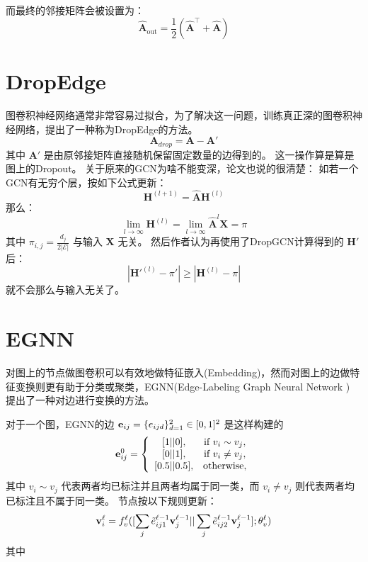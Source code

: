 \documentclass[color=gray,base=hide,cn]{elegantbook}
\begin{document}
而最终的邻接矩阵会被设置为：
\begin{equation}
\mathbf{\hat{A}}_\text{out} = \frac{1}{2} \left(\mathbf{\hat{A}}^\top + \mathbf{\hat{A}} \right)
\end{equation}

\section{DropEdge}
图卷积神经网络通常非常容易过拟合，为了解决这一问题，训练真正深的图卷积神经网络，\cite{Rong2019TheTD}提出了一种称为DropEdge的方法。
\begin{equation}
\mathbf{A}_{drop} = \mathbf{A}-\mathbf{A}'
\end{equation}
其中 $\mathbf{A}'$ 是由原邻接矩阵直接随机保留固定数量的边得到的。
这一操作算是算是图上的Dropout。
关于原来的GCN为啥不能变深，论文也说的很清楚：
如若一个GCN有无穷个层，按如下公式更新：
\begin{equation}
\mathbf{H}^{(l+1)} = \hat{\mathbf{A}}\mathbf{H}^{(l)}
\end{equation}
那么：
\begin{equation}
\lim_{l \rightarrow \infty} \mathbf{H}^{(l)} = \lim_{l \rightarrow \infty} \hat{\mathbf{A}}^l\mathbf{X}=\pi
\end{equation}
其中 $\pi_{i,j}=\frac{d_j}{2|\mathcal{E}|}$ 与输入 $\mathbf{X}$ 无关。
然后作者认为再使用了DropGCN计算得到的 $\mathbf{H}'$ 后：
\begin{equation}
 |\mathbf{H}'^{(l)} - \pi'| \ge |\mathbf{H}^{(l)} - \pi|
\end{equation}
就不会那么与输入无关了。

\section{EGNN}
对图上的节点做图卷积可以有效地做特征嵌入(Embedding)，然而对图上的边做特征变换则更有助于分类或聚类，EGNN(Edge-Labeling Graph Neural Network \cite{kim2019edgelabeling}) 提出了一种对边进行变换的方法。

对于一个图，EGNN的边 ${\bf e}_{ij} = \{e_{ijd}\}_{d=1}^{2} \in [0, 1]^2$ 是这样构建的
\begin{equation}
{\bf e}_{ij}^0 = \left\{\begin{array}{cc} {[1||0]},& \mbox{if} ~ v_i \sim v_j, \\ {[0||1]},&  \mbox{if} ~ v_i \neq v_j, \\ {[0.5||0.5]},& \mbox{otherwise}, \end{array} \right.
\end{equation}
其中 $v_i \sim v_j$ 代表两者均已标注并且两者均属于同一类，而 $v_i \neq v_j$ 则代表两者均已标注且不属于同一类。
节点按以下规则更新：
\begin{equation}
{\bf v}_{i}^{\ell} = f_v^{\ell}([\sum_{j} {\tilde e}_{ij1}^{\ell-1}{\bf v}_j^{\ell-1}||\sum_{j} {\tilde e}_{ij2}^{\ell-1}{\bf v}_j^{\ell-1}];\theta_v^{\ell})
\end{equation}
其中 
\end{document}
